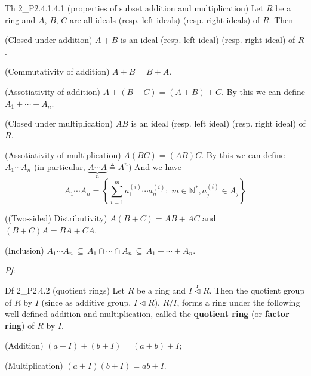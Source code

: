 \documentclass{article}
\newcommand{\nles}{\vartriangleleft}
\newcommand{\ideal}{\overset{\text{r}}{\nles}} %
\begin{document}
\begin{Th}{Th 2\_P2.4.1.4.1 (properties of subset addition and multiplication)}
    Let $R$ be a ring and $A$, $B$, $C$ are all ideals (resp. left ideals) (resp. right ideals) of $R$. Then
    \begin{compactenum}
        \item (Closed under addition) $A+B$ is an ideal (resp. left ideal) (resp. right ideal) of $R$.
        \item (Commutativity of addition) $A+B = B+A$.
        \item (Assotiativity of addition) $A+(B+C) = (A+B)+C$. \textcolor{Df}{By this we can define $A_1 + \cdots + A_n$.}
        \item (Closed under multiplication) $AB$ is an ideal (resp. left ideal) (resp. right ideal) of $R$.
        \item (Assotiativity of multiplication) $A(BC) = (AB)C$. \textcolor{Df}{By this we can define $A_1 \cdots A_n$ (in particular, $\underbrace{A\cdots A}_{n} \triangleq A^n$)} And we have
        $$ A_1 \cdots A_n = \left\{\sum_{i=1}^{m} a_1^{(i)} \cdots a_n^{(i)}:\; m\in\mathbb{N}^\ast, a_j^{(i)}\in A_j \right\} $$
        \item ((Two-sided) Distributivity) $A(B+C) = AB + AC$ and $(B+C)A = BA + CA$.
        \item (Inclusion) $A_1\cdots A_n \,\subseteq\, A_1\cap\cdots\cap A_n \,\subseteq\, A_1+\cdots + A_n$.
    \end{compactenum}
    \tcblower
    \textit{Pf}: 
\end{Th}

\begin{Df}{Df 2\_P2.4.2 (quotient rings)}
    Let $R$ be a ring and $I\ideal R$. Then the quotient group of $R$ by $I$ (since as additive group, $I\nles R$), $R/I$, \textcolor{Th}{forms a ring under the following well-defined addition and multiplication,} called the \textbf{quotient ring} (or \textbf{factor ring}) of $R$ by $I$.
    \begin{compactenum}
        \item (Addition) $(a+I)+(b+I) = (a+b)+I$;
        \item (Multiplication) $(a+I)(b+I) = ab+I$.
    \end{compactenum}
\end{Df}
\end{document}
